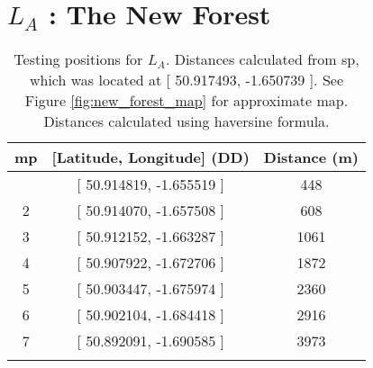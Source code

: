 \section{$L_A$ : The New Forest}\label{sec:new_forest_test_pos}

\begin{table}[H]
\centering
\caption[Testing positions for $L_A$]{Testing positions for $L_A$. Distances calculated from \ac{sp}, which was located at [ 50.917493, -1.650739 ]. See Figure \ref{fig:new_forest_map} for approximate map. Distances calculated using haversine formula. }
\begin{tabular}{ccc}
    \toprule
\textbf{\ac{mp}} & \textbf{[Latitude, Longitude]} (DD) & \textbf{Distance} (m)\\
    \midrule\addlinespace
1 & [ 50.914819, -1.655519 ] & 448 \\
2 & [ 50.914070, -1.657508 ] & 608 \\
3 & [ 50.912152, -1.663287 ] & 1061 \\
4 & [ 50.907922, -1.672706 ] & 1872 \\
5 & [ 50.903447, -1.675974 ] & 2360 \\
6 & [ 50.902104, -1.684418 ] & 2916 \\
7 & [ 50.892091, -1.690585 ] & 3973 \\
    \addlinespace\bottomrule
\end{tabular}
\end{table}
